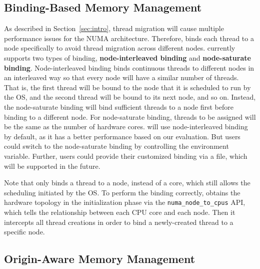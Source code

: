 \subsection{Binding-Based Memory Management} 
\label{sec:balance}
As described in Section~\ref{sec:intro}, thread migration will cause multiple performance issues for the NUMA architecture. Therefore, \NM{} binds each thread to a node specifically to avoid thread migration across different nodes.  \NM{} currently supports two types of binding, \textbf{node-interleaved binding} and \textbf{node-saturate binding}. Node-interleaved binding binds continuous threads to different nodes in an interleaved way so that every node will have a similar number of threads. That is, the first thread will be bound to the node that it is scheduled to run by the OS, and the second thread will be bound to its next node, and so on. Instead, the node-saturate binding will bind sufficient threads to a node first before binding to a different node. For node-saturate binding, threads to be assigned will be the same as the number of hardware cores.  \NM{} will use node-interleaved binding by default, as it has a better performance based on our evaluation. But users could switch to the node-saturate binding by controlling the environment variable. Further, users could provide their customized binding via a file, which will be supported in the future. 

Note that \NM{} only binds a thread to a node, instead of a core, which still allows the scheduling initiated by the OS. To perform the binding correctly, \NM{} obtains the hardware topology in the initialization phase via the \texttt{numa\_node\_to\_cpus} API, which tells the relationship between each CPU core and each 
node. Then it intercepts all thread creations in order to bind a newly-created thread to a specific node.

\subsection{Origin-Aware Memory Management} 
\label{sec:origin}


